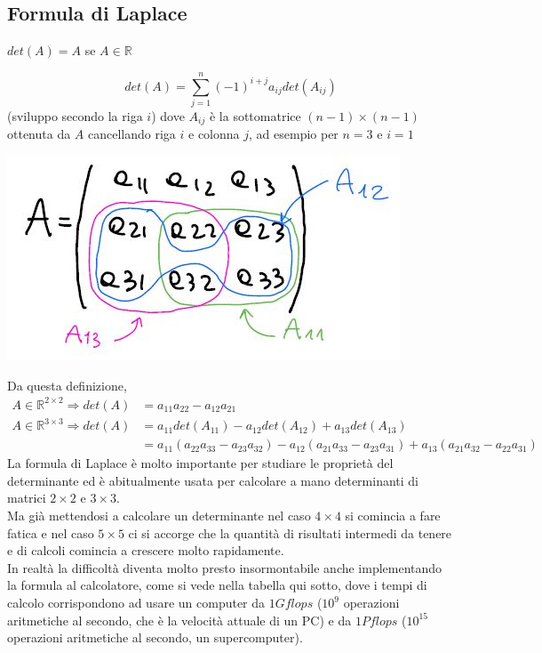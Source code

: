 \documentclass[12pt,a4paper]{article}
\begin{document}
\subsection{Formula di Laplace}
\begin{center}
    $det(A)=A$ se $A\in\mathbb{R}$
\end{center}
\begin{equation*}
    det(A)=\sum_{j=1}^n(-1)^{i+j}a_{ij}det(A_{ij})
\end{equation*}
(sviluppo secondo la riga $i$) dove $A_{ij}$ è la sottomatrice $(n-1)\times(n-1)$ ottenuta da $A$ cancellando riga $i$ e colonna $j$, ad esempio per $n=3$ e $i=1$
\begin{center}
    \includegraphics[scale=0.5]{lez21_pag4.jpg}    
\end{center}
Da questa definizione,
\begin{align*}
    A\in\mathbb{R}^{2\times 2}\Rightarrow det(A) &=a_{11}a_{22}-a_{12}a_{21} \\
    A\in\mathbb{R}^{3\times 3}\Rightarrow det(A) &=a_{11}det(A_{11})-a_{12}det(A_{12})+a_{13}det(A_{13}) \\
    & = a_{11}(a_{22}a_{33}-a_{23}a_{32})-a_{12}(a_{21}a_{33}-a_{23}a_{31})+a_{13}(a_{21}a_{32}-a_{22}a_{31})
\end{align*}
La formula di Laplace è molto importante per studiare le proprietà del determinante ed è abitualmente usata per calcolare a mano determinanti di matrici $2\times 2$ e $3\times 3$.\\
Ma già mettendosi a calcolare un determinante nel caso $4\times 4$ si comincia a fare fatica e nel caso $5\times5$ ci si accorge che la quantità di risultati intermedi da tenere e di calcoli comincia a crescere molto rapidamente.\\In realtà la difficoltà diventa molto presto insormontabile anche implementando la formula al calcolatore, come si vede nella tabella qui sotto, dove i tempi di calcolo corrispondono ad usare un computer da $1Gflops$ ($10^9$ operazioni aritmetiche al secondo, che è la velocità attuale di un PC) e da $1Pflops$ ($10^{15}$ operazioni aritmetiche al secondo, un supercomputer).
\end{document}
